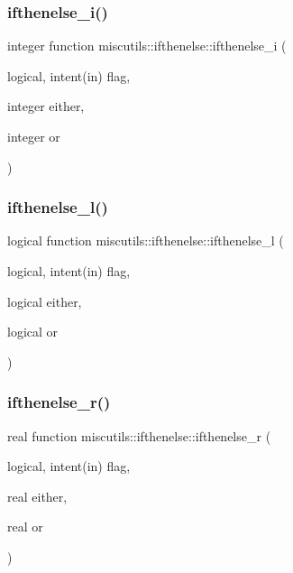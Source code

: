 \mbox{\label{interfacemiscutils_1_1ifthenelse_a0bc2adf139e500a22c09641d4bb8e682}} 
\subsubsection{\texorpdfstring{ifthenelse\+\_\+i()}{ifthenelse\_i()}}
{\footnotesize\ttfamily integer function miscutils\+::ifthenelse\+::ifthenelse\+\_\+i (\begin{DoxyParamCaption}\item[{logical, intent(in)}]{flag,  }\item[{integer}]{either,  }\item[{integer}]{or }\end{DoxyParamCaption})}

\mbox{\label{interfacemiscutils_1_1ifthenelse_aa8a41eaf1650f63c8fbfaaddfdb4ab53}} 
\subsubsection{\texorpdfstring{ifthenelse\+\_\+l()}{ifthenelse\_l()}}
{\footnotesize\ttfamily logical function miscutils\+::ifthenelse\+::ifthenelse\+\_\+l (\begin{DoxyParamCaption}\item[{logical, intent(in)}]{flag,  }\item[{logical}]{either,  }\item[{logical}]{or }\end{DoxyParamCaption})}

\mbox{\label{interfacemiscutils_1_1ifthenelse_a33bb5263b33632496f703ac0e87f442e}} 
\subsubsection{\texorpdfstring{ifthenelse\+\_\+r()}{ifthenelse\_r()}}
{\footnotesize\ttfamily real function miscutils\+::ifthenelse\+::ifthenelse\+\_\+r (\begin{DoxyParamCaption}\item[{logical, intent(in)}]{flag,  }\item[{real}]{either,  }\item[{real}]{or }\end{DoxyParamCaption})}

